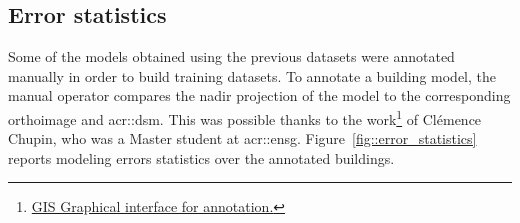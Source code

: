     \subsection{Error statistics}
        \label{subsec::experiments::datasets::stats}
        \begin{figure}[htpb]
            \centering
        \end{figure}

        Some of the models obtained using the previous datasets were annotated manually in order to build training datasets.
        To annotate a building model, the manual operator compares the nadir projection of the model to the corresponding orthoimage and \gls{acr::dsm}.
        This was possible thanks to the work\footnote{\href{https://github.com/CHUPClem/sGrISner.git}{GIS Graphical interface for annotation.}} of Clémence Chupin, who was a Master student at \gls{acr::ensg}.
        Figure~\ref{fig::error_statistics} reports modeling errors statistics over the annotated buildings.\\

